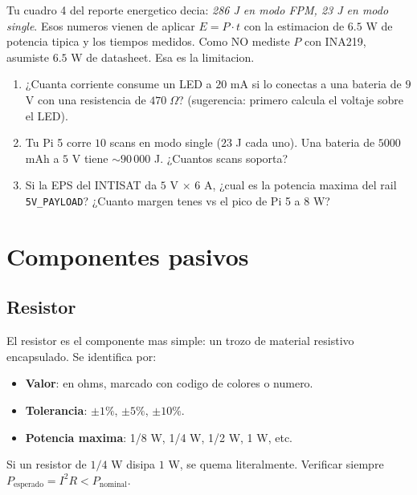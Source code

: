 \documentclass[11pt,a4paper,oneside,openright]{book}
\begin{document}
\begin{payload}
Tu cuadro 4 del reporte energetico decia: \emph{286 J en modo FPM, 23 J en
modo single}. Esos numeros vienen de aplicar $E = P \cdot t$ con la
estimacion de $6.5$ W de potencia tipica y los tiempos medidos. Como NO
mediste $P$ con INA219, asumiste $6.5$ W de datasheet. Esa es la limitacion.
\end{payload}

\begin{ejercicio}
\begin{enumerate}[leftmargin=2em]
  \item ¿Cuanta corriente consume un LED a $20$ mA si lo conectas a una
        bateria de $9$ V con una resistencia de $470\;\Omega$? (sugerencia:
        primero calcula el voltaje sobre el LED).
  \item Tu Pi 5 corre $10$ scans en modo single ($23$ J cada uno). Una
        bateria de $5000$ mAh a $5$ V tiene $\sim 90\,000$ J. ¿Cuantos scans
        soporta?
  \item Si la EPS del INTISAT da $5$ V $\times$ $6$ A, ¿cual es la potencia
        maxima del rail \texttt{5V\_PAYLOAD}? ¿Cuanto margen tenes vs el
        pico de Pi 5 a $8$ W?
\end{enumerate}
\end{ejercicio}

\chapter{Componentes pasivos}

\section{Resistor}

El resistor es el componente mas simple: un trozo de material resistivo
encapsulado. Se identifica por:

\begin{itemize}[leftmargin=2em]
  \item \textbf{Valor}: en ohms, marcado con codigo de colores o numero.
  \item \textbf{Tolerancia}: $\pm 1\%$, $\pm 5\%$, $\pm 10\%$.
  \item \textbf{Potencia maxima}: 1/8 W, 1/4 W, 1/2 W, 1 W, etc.
\end{itemize}

\begin{cuidado}
Si un resistor de $1/4$ W disipa $1$ W, se quema literalmente. Verificar
siempre $P_{\text{esperado}} = I^2 R < P_{\text{nominal}}$.
\end{cuidado}
\end{document}
